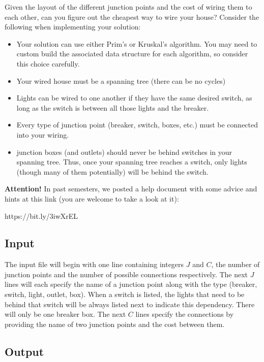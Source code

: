 \documentclass[11pt]{article}
\begin{document}
Given the layout of the different junction points and the cost of wiring them to each other, can you figure out the cheapest way to wire your house? Consider the following when implementing your solution:

\begin{itemize}
	\item Your solution can use either Prim's or Kruskal's algorithm. You may need to custom build the associated data structure for each algorithm, so consider this choice 
carefully.
	\item Your wired house must be a spanning tree (there can be no cycles)
	\item Lights can be wired to one another if they have the same desired switch, as long as the switch is between all those lights and the breaker.
	\item Every type of junction point (breaker, switch, boxes, etc.) must be connected into your wiring. 
	\item junction boxes (and outlets) should never be behind switches in your spanning tree. Thus, once your spanning tree reaches a switch, only lights (though many of them potentially) will be behind the switch.
\end{itemize}

{\bf Attention!}  In past semesters, we posted a help document with some advice and hints at this link (you are welcome to take a look at it): \\
\begin{verb}
https://bit.ly/3iwXrEL
\end{verb}

\subsection*{Input}
The input file will begin with one line containing integers $J$ and $C$, the number of junction points and the number of possible connections respectively. The next $J$ lines will each specify the name of a junction point along with the type (breaker, switch, light, outlet, box). When a switch is listed, the lights that need to be behind that switch will be always listed next to indicate this dependency. There will only be one breaker box. The next $C$ lines specify the connections by providing the name of two junction points and the cost between them.

\subsection*{Output}
\end{document}
